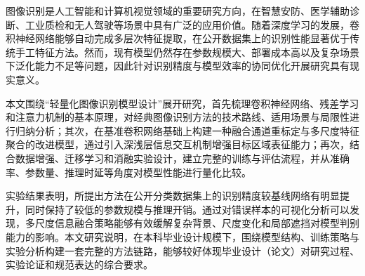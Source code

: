 图像识别是人工智能和计算机视觉领域的重要研究方向，在智慧安防、医学辅助诊断、工业质检和无人驾驶等场景中具有广泛的应用价值。随着深度学习的发展，卷积神经网络能够自动完成多层次特征提取，在公开数据集上的识别性能显著优于传统手工特征方法。然而，现有模型仍然存在参数规模大、部署成本高以及复杂场景下泛化能力不足等问题，因此针对识别精度与模型效率的协同优化开展研究具有现实意义。

本文围绕“轻量化图像识别模型设计”展开研究，首先梳理卷积神经网络、残差学习和注意力机制的基本原理，对经典图像识别方法的技术路线、适用场景与局限性进行归纳分析；其次，在基准卷积网络基础上构建一种融合通道重标定与多尺度特征聚合的改进模型，通过引入深浅层信息交互机制增强目标区域表征能力；再次，结合数据增强、迁移学习和消融实验设计，建立完整的训练与评估流程，并从准确率、参数量、推理时延等角度对模型性能进行量化比较。

实验结果表明，所提出方法在公开分类数据集上的识别精度较基线网络有明显提升，同时保持了较低的参数规模与推理开销。通过对错误样本的可视化分析可以发现，多尺度信息融合策略能够有效缓解复杂背景、尺度变化和局部遮挡对模型判别能力的影响。本文研究说明，在本科毕业设计规模下，围绕模型结构、训练策略与实验分析构建一套完整的方法链路，能够较好体现毕业设计（论文）对研究过程、实验论证和规范表达的综合要求。

